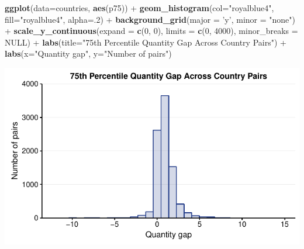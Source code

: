 \documentclass[10pt,]{article}
\newenvironment{Shaded}{\begin{snugshade}}{\end{snugshade}}
\newcommand{\KeywordTok}[1]{\textcolor[rgb]{0.13,0.29,0.53}{\textbf{{#1}}}}
\newcommand{\DataTypeTok}[1]{\textcolor[rgb]{0.13,0.29,0.53}{{#1}}}
\newcommand{\DecValTok}[1]{\textcolor[rgb]{0.00,0.00,0.81}{{#1}}}
\newcommand{\StringTok}[1]{\textcolor[rgb]{0.31,0.60,0.02}{{#1}}}
\newcommand{\OtherTok}[1]{\textcolor[rgb]{0.56,0.35,0.01}{{#1}}}
\newcommand{\NormalTok}[1]{{#1}}
\begin{document}
\begin{Shaded}
\begin{Highlighting}[]
\KeywordTok{ggplot}\NormalTok{(}\DataTypeTok{data=}\NormalTok{countries, }\KeywordTok{aes}\NormalTok{(p75)) +}
\StringTok{  }\KeywordTok{geom_histogram}\NormalTok{(}\DataTypeTok{col=}\StringTok{"royalblue4"}\NormalTok{,}
                 \DataTypeTok{fill=}\StringTok{"royalblue4"}\NormalTok{,}
                 \DataTypeTok{alpha=}\NormalTok{.}\DecValTok{2}\NormalTok{) +}
\StringTok{  }\KeywordTok{background_grid}\NormalTok{(}\DataTypeTok{major =} \StringTok{'y'}\NormalTok{, }\DataTypeTok{minor =} \StringTok{"none"}\NormalTok{) +}
\StringTok{  }\KeywordTok{scale_y_continuous}\NormalTok{(}\DataTypeTok{expand =} \KeywordTok{c}\NormalTok{(}\DecValTok{0}\NormalTok{, }\DecValTok{0}\NormalTok{), }\DataTypeTok{limits =} \KeywordTok{c}\NormalTok{(}\DecValTok{0}\NormalTok{, }\DecValTok{4000}\NormalTok{),  }\DataTypeTok{minor_breaks =} \OtherTok{NULL}\NormalTok{) +}
\StringTok{  }\KeywordTok{labs}\NormalTok{(}\DataTypeTok{title=}\StringTok{"75th Percentile Quantity Gap Across Country Pairs"}\NormalTok{) +}
\StringTok{  }\KeywordTok{labs}\NormalTok{(}\DataTypeTok{x=}\StringTok{"Quantity gap"}\NormalTok{, }\DataTypeTok{y=}\StringTok{"Number of pairs"}\NormalTok{)}
\end{Highlighting}
\end{Shaded}

\begin{center}\includegraphics{Figs/qty_summary-9} \end{center}
\end{document}

